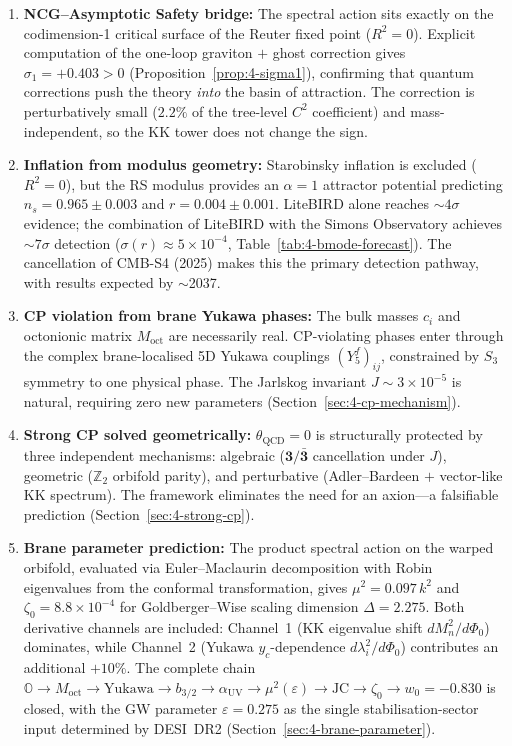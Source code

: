 \begin{enumerate}
  \item \textbf{NCG--Asymptotic Safety bridge:} The spectral action sits exactly on the codimension-1 critical surface of the Reuter fixed point ($R^2 = 0$).  Explicit computation of the one-loop graviton $+$ ghost correction gives $\sigma_1 = +0.403 > 0$ (Proposition~\ref{prop:4-sigma1}), confirming that quantum corrections push the theory \emph{into} the basin of attraction.  The correction is perturbatively small ($2.2\%$ of the tree-level $C^2$ coefficient) and mass-independent, so the KK tower does not change the sign.

  \item \textbf{Inflation from modulus geometry:} Starobinsky inflation is excluded ($R^2 = 0$), but the RS modulus provides an $\alpha = 1$ attractor potential predicting $n_s = 0.965 \pm 0.003$ and $r = 0.004 \pm 0.001$.  LiteBIRD alone reaches $\sim 4\sigma$ evidence; the combination of LiteBIRD with the Simons Observatory achieves $\sim 7\sigma$ detection ($\sigma(r) \approx 5 \times 10^{-4}$, Table~\ref{tab:4-bmode-forecast}).  The cancellation of CMB-S4 (2025) makes this the primary detection pathway, with results expected by $\sim$2037.

  \item \textbf{CP violation from brane Yukawa phases:} The bulk masses $c_i$ and octonionic matrix $M_{\mathrm{oct}}$ are necessarily real.  CP-violating phases enter through the complex brane-localised 5D Yukawa couplings $(Y_5^f)_{ij}$, constrained by $S_3$ symmetry to one physical phase.  The Jarlskog invariant $J \sim 3 \times 10^{-5}$ is natural, requiring zero new parameters (Section~\ref{sec:4-cp-mechanism}).

  \item \textbf{Strong CP solved geometrically:} $\theta_{\mathrm{QCD}} = 0$ is structurally protected by three independent mechanisms: algebraic ($\mathbf{3}/\bar{\mathbf{3}}$ cancellation under $J$), geometric ($\mathbb{Z}_2$ orbifold parity), and perturbative (Adler--Bardeen $+$ vector-like KK spectrum).  The framework eliminates the need for an axion---a falsifiable prediction (Section~\ref{sec:4-strong-cp}).

  \item \textbf{Brane parameter prediction:} The product spectral action on the warped orbifold, evaluated via Euler--Maclaurin decomposition with Robin eigenvalues from the conformal transformation, gives $\mu^2 = 0.097\, k^2$ and $\zeta_0 = 8.8 \times 10^{-4}$ for Goldberger--Wise scaling dimension $\Delta = 2.275$.  Both derivative channels are included: Channel~1 (KK eigenvalue shift $dM_n^2/d\Phi_0$) dominates, while Channel~2 (Yukawa $y_c$-dependence $d\lambda_i^2/d\Phi_0$) contributes an additional $+10\%$.  The complete chain $\mathbb{O} \to M_{\mathrm{oct}} \to \text{Yukawa} \to b_{3/2} \to \alpha_{\mathrm{UV}} \to \mu^2(\varepsilon) \to \text{JC} \to \zeta_0 \to w_0 = -0.830$ is closed, with the GW parameter $\varepsilon = 0.275$ as the single stabilisation-sector input determined by DESI~DR2 (Section~\ref{sec:4-brane-parameter}).


\end{enumerate}

